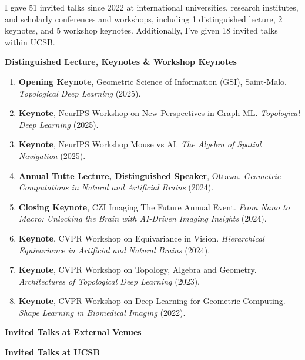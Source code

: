 I gave 51 invited talks since 2022 at international universities, research institutes, and scholarly conferences and workshops, including 1 distinguished lecture, 2 keynotes, and 5 workshop keynotes. Additionally, I've given 18 invited talks within UCSB.

\smallskip
\noindent\textbf{Distinguished Lecture, Keynotes \& Workshop Keynotes}
\begingroup\small 
\begin{enumerate}[leftmargin=*,itemsep=0.1em,topsep=0.2em,parsep=0pt,partopsep=0pt]
    \item \textbf{Opening Keynote}, Geometric Science of Information (GSI), Saint-Malo. \textit{Topological Deep Learning} (2025).
    \item \textbf{Keynote}, NeurIPS Workshop on New Perspectives in Graph ML. \textit{Topological Deep Learning} (2025).
    \item \textbf{Keynote}, NeurIPS Workshop Mouse vs AI. \textit{The Algebra of Spatial Navigation} (2025).
    \item \textbf{Annual Tutte Lecture, Distinguished Speaker}, Ottawa. \textit{Geometric Computations in Natural and Artificial Brains} (2024).
    \item \textbf{Closing Keynote}, CZI Imaging The Future Annual Event. \textit{From Nano to Macro: Unlocking the Brain with AI-Driven Imaging Insights} (2024).
    \item \textbf{Keynote}, CVPR Workshop on Equivariance in Vision. \textit{Hierarchical Equivariance in Artificial and Natural Brains} (2024).
    \item \textbf{Keynote}, CVPR Workshop on Topology, Algebra and Geometry. \textit{Architectures of Topological Deep Learning} (2023).
    \item \textbf{Keynote}, CVPR Workshop on Deep Learning for Geometric Computing. \textit{Shape Learning in Biomedical Imaging} (2022).
\end{enumerate}
\endgroup




\smallskip
\noindent\textbf{Invited Talks at External Venues}
\begingroup\small 
{}
\endgroup

\smallskip
\noindent\textbf{Invited Talks at UCSB}
\begingroup\small 
{}
\endgroup


